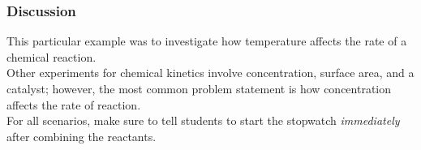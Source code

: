 \subsubsection{Discussion}
This particular example was to investigate how temperature affects the rate of a chemical reaction.\\
Other experiments for chemical kinetics involve concentration, surface area, and a catalyst; however, the most common problem statement is how concentration affects the rate of reaction.\\
For all scenarios, make sure to tell students to start the stopwatch \textit{immediately} after combining the reactants.\\